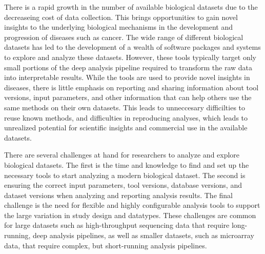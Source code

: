 There is a rapid growth in the number of available biological datasets due to
the decreaseing cost of data collection.  This brings opportunities to gain
novel insights to the underlying biological mechanisms in the development and
progression of diseases such as cancer.  The wide range of different biological
datasets has led to the development of a wealth of software packages and systems
to explore and analyze these datasets.  However, these tools typically target
only small portions of the deep analysis pipeline required to transform the raw
data into interpretable results. While the tools are used to provide novel
insights in diseases, there is little emphasis on reporting and sharing
information about tool versions, input parameters, and other information that
can help others use the same methods on their own datasets. This leads to
unneccesary difficilties to reuse known methods, and difficulties in reproducing
analyses, which leads to unrealized potential for scientific insights and
commercial use in the available datasets. 

There are several challenges at hand for researchers to analyze and explore
biological datasets. The first is the time and knowledge to find and set up the
necessary tools to start analyzing a modern biological dataset. The second is
ensuring the correct input parameters, tool versions, database versions, and
dataset versions when analyzing and reporting analysis results. The final
challenge is the need for flexible and highly configurable analysis tools to
support the large variation in study design and datatypes. These challenges are
common for large datasets such as high-throughput sequencing data that require
long-running, deep analysis pipelines, as well as smaller datasets, such as
microarray data, that require complex, but short-running analysis pipelines. 

